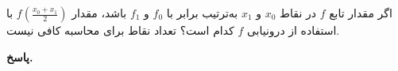 اگر مقدار تابع 
\(f\)
در نقاط 
\(x_0\)
 و 
 \(x_1\)
 به‌ترتیب برابر با
 \(f_0\)
 و 
 \(f_1\)
 باشد، مقدار 
 \(f(\frac{x_0 + x_1}{2})\)
 با استفاده از درونیابی 
 \(f\)
کدام است؟
          {تعداد نقاط برای محاسبه کافی نیست.}

\begin{answer}
	
	\textbf{پاسخ.}
	
\end{answer}
